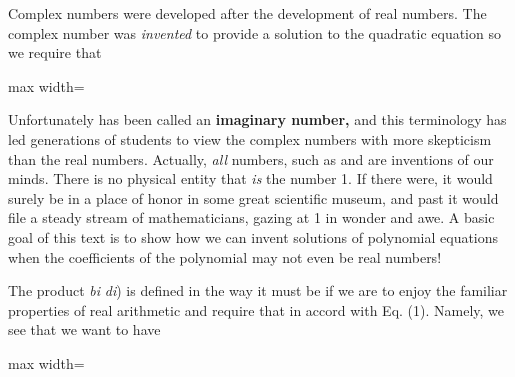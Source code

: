 \documentclass[11pt,oneside]{article}
\begin{document}
\BookNarrativetrue

\begin{BookBody}

Complex numbers were developed after the development of real numbers. The complex number  was\textit{ invented} to provide a solution to the quadratic equation  so we require that

\begin{center}\begin{adjustbox}{max width=\linewidth}\end{adjustbox}\end{center}

\noindent Unfortunately has been called an\textbf{ imaginary number,} and this terminology has led generations of students to view the complex numbers with more skepticism than the real numbers. Actually,\textit{ all} numbers, such as  and  are inventions of our minds. There is no physical entity that\textit{ is} the number 1. If there were, it would surely be in a place of honor in some great scientific museum, and past it would file a steady stream of mathematicians, gazing at 1 in wonder and awe. A basic goal of this text is to show how we can invent solutions of polynomial equations when the coefficients of the polynomial may not even be real numbers!


\noindent The product  \textit{bi} \textit{di}) is defined in the way it must be if we are to enjoy the familiar properties of real arithmetic and require that  in accord with Eq. (1). Namely, we see that we want to have

\begin{center}\begin{adjustbox}{max width=\linewidth}\end{adjustbox}\end{center}


\end{BookBody}
\end{document}
